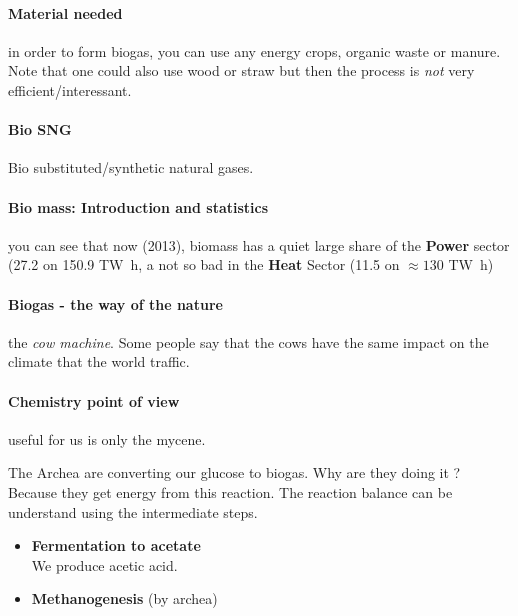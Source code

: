 \documentclass[10pt,a4paper]{article}
\begin{document}
 \paragraph{Material needed}in order to form biogas, you can use any energy crops, organic waste or manure. Note that one could also use wood or straw but then the process is \emph{not} very efficient/interessant.
 
 \paragraph{Bio SNG}Bio substituted/synthetic natural gases. 
 
 \paragraph{Bio mass: Introduction and statistics}you can see that now (2013), biomass has a quiet large share of the \textbf{Power} sector (27.2 on 150.9 \si{\tera\watt\hour}, a not so bad in the \textbf{Heat} Sector (11.5 on $\approx 130$ \si{\tera\watt\hour})
 
 \paragraph{Biogas - the way of the nature}the \textit{cow machine}. Some people say that the cows have the same impact on the climate that the world traffic.
 
 \paragraph{Chemistry point of view} useful for us is only the mycene.
 
 The Archea are converting our glucose to biogas. Why are they doing it ? Because they get energy from this reaction. The reaction balance can be understand using the intermediate steps.
 
 \begin{itemize}
 \item \textbf{Fermentation to acetate}  \\
 We produce acetic acid.
 \item \textbf{Methanogenesis} (by archea) 
 \end{itemize}
 
\end{document}
